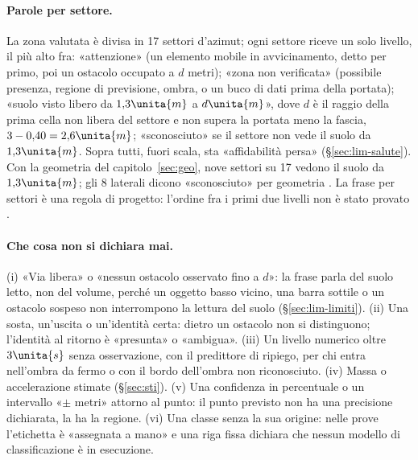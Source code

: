 \paragraph{Parole per settore.} La zona valutata è divisa in 17 settori d'azimut; ogni settore riceve un solo livello, il più alto fra: «attenzione» (un elemento mobile in avvicinamento, detto per primo, poi un ostacolo occupato a $d$ metri); «zona non verificata» (possibile presenza, regione di previsione, ombra, o un buco di dati prima della portata); «suolo visto libero da $1{,}3\unita{m}$ a $d\unita{m}$», dove $d$ è il raggio della prima cella non libera del settore e non supera la portata meno la fascia, $3-0{,}40=2{,}6\unita{m}$; «sconosciuto» se il settore non vede il suolo da $1{,}3\unita{m}$. Sopra tutti, fuori scala, sta «affidabilità persa» (\S\ref{sec:lim-salute}). Con la geometria del capitolo~\ref{sec:geo}, nove settori su 17 vedono il suolo da $1{,}3\unita{m}$; gli 8 laterali dicono «sconosciuto» per geometria . La frase per settori è una regola di progetto: l'ordine fra i primi due livelli non è stato provato .

\paragraph{Che cosa non si dichiara mai.} (i) «Via libera» o «nessun ostacolo osservato fino a $d$»: la frase parla del suolo letto, non del volume, perché un oggetto basso vicino, una barra sottile o un ostacolo sospeso non interrompono la lettura del suolo (\S\ref{sec:lim-limiti}). (ii) Una sosta, un'uscita o un'identità certa: dietro un ostacolo non si distinguono; l'identità al ritorno è «presunta» o «ambigua». (iii) Un livello numerico oltre $3\unita{s}$ senza osservazione, con il predittore di ripiego, per chi entra nell'ombra da fermo o con il bordo dell'ombra non riconosciuto. (iv) Massa o accelerazione stimate (\S\ref{sec:sti}). (v) Una confidenza in percentuale o un intervallo «$\pm$ metri» attorno al punto: il punto previsto non ha una precisione dichiarata, la ha la regione. (vi) Una classe senza la sua origine: nelle prove l'etichetta è «assegnata a mano» e una riga fissa dichiara che nessun modello di classificazione è in esecuzione.

